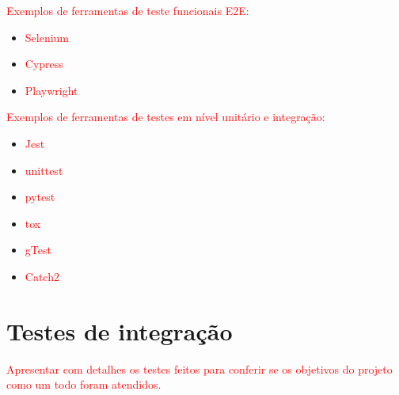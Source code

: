 \textcolor{red}{Exemplos de ferramentas de teste funcionais E2E:}
\begin{itemize}
    \item \textcolor{red}{Selenium} 
    \item \textcolor{red}{Cypress}
    \item \textcolor{red}{Playwright}
\end{itemize}

\textcolor{red}{Exemplos de ferramentas de testes em nível unitário e integração:}
\begin{itemize}
    \item \textcolor{red}{Jest}
    \item \textcolor{red}{unittest}
    \item \textcolor{red}{pytest}
    \item \textcolor{red}{tox}
    \item \textcolor{red}{gTest}
    \item \textcolor{red}{Catch2}
\end{itemize}

\section{Testes de integração}

\textcolor{red}{Apresentar com detalhes os testes feitos para conferir se os objetivos do projeto como um todo foram atendidos.}


